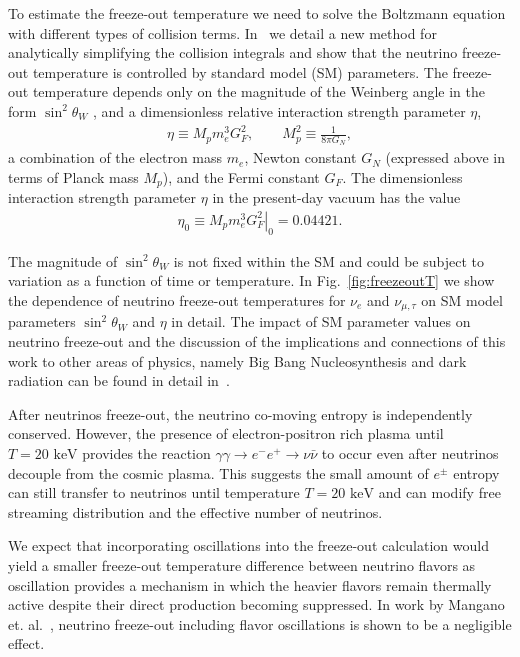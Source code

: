 \documentclass[universe,article,submit,moreauthors,pdftex,a4paper]{Definitions/mdpi}
\newcommand{\keV}{\text{ keV}}
\newcommand*{\rf}[1]{Fig.~{\ref{#1}}}
\begin{document}
 To estimate the freeze-out temperature we need to solve the Boltzmann equation with different types of collision terms. In~\cite{Birrell:2014uka} we detail a new method for analytically simplifying the collision integrals and show that the neutrino freeze-out temperature is controlled by standard model (SM) parameters. The freeze-out temperature depends only on the magnitude of the Weinberg angle in the form $\sin^2\theta_W$ , and a dimensionless relative interaction strength parameter $\eta$,
\begin{align}
\eta\equiv M_p m_e^3 G_F^2, \qquad M_p^2\equiv \frac{1}{8\pi G_N}, \end{align}
a combination of the electron mass $m_e$, Newton constant $G_N$ (expressed above in terms of Planck mass $M_p$), and the Fermi constant $G_F$. The dimensionless interaction strength parameter $\eta$ in the present-day vacuum has the value
\begin{align}
\eta_0\equiv \left.M_p m_e^3 G_F^2\right|_0 = 0.04421 .
\end{align}

The magnitude of $\sin^2\theta_W$ is not fixed within the SM and could be subject to variation as a function of time or temperature. In \rf{fig:freezeoutT} we show the dependence of neutrino freeze-out temperatures for $\nu_e$ and $\nu_{\mu,\tau}$ on SM model parameters $\sin^2\theta_W$ and $\eta$ in detail. The impact of SM parameter values on neutrino freeze-out and the discussion of the implications and connections of this work to other areas of physics, namely Big Bang Nucleosynthesis and dark radiation can be found in detail in~\cite{Dreiner:2011fp,Boehm:2012gr,Blennow:2012de,Birrell:2014uka}.

After neutrinos freeze-out, the neutrino co-moving entropy is independently conserved. However, the presence of electron-positron rich plasma until $T=20\keV$ provides the reaction $\gamma\gamma\to e^-e^+\to\nu\bar{\nu}$ to occur even after neutrinos decouple from the cosmic plasma. This suggests the small amount of $e^\pm$ entropy can still transfer to neutrinos until temperature $T=20\keV$ and can modify free streaming distribution and the effective number of neutrinos.

We expect that incorporating oscillations into the freeze-out calculation would yield a smaller freeze-out temperature difference between neutrino flavors as oscillation provides a mechanism in which the heavier flavors remain thermally active despite their direct production becoming suppressed. In work by Mangano et. al.~\cite{Mangano:2005cc}, neutrino freeze-out including flavor oscillations is shown to be a negligible effect.
\end{document}
